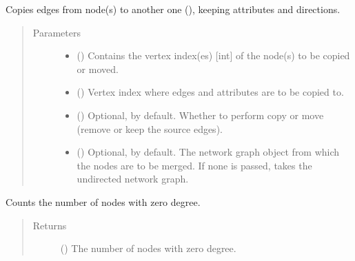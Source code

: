 \documentclass[letterpaper,10pt,english]{sphinxmanual}
\begin{document}
\begin{fulllineitems}
\begin{fulllineitems}
\label{\detokenize{reference:pypath.main.PyPath.copy_edges}}
Copies edges from  node(s) to another one (),
keeping attributes and directions.
\begin{quote}\begin{description}
\item[{Parameters}] \leavevmode\begin{itemize}
\item {} 
 () \textendash{} Contains the vertex index(es) {[}int{]} of the node(s) to be
copied or moved.

\item {} 
 () \textendash{} Vertex index where edges and attributes are to be copied to.

\item {} 
 () \textendash{} Optional,  by default. Whether to perform copy or
move (remove or keep the source edges).

\item {} 
 () \textendash{} Optional,  by default. The network graph object from
which the nodes are to be merged. If none is passed, takes
the undirected network graph.

\end{itemize}

\end{description}\end{quote}

\end{fulllineitems}


\begin{fulllineitems}
\label{\detokenize{reference:pypath.main.PyPath.count_sol}}
Counts the number of nodes with zero degree.
\begin{quote}\begin{description}
\item[{Returns}] \leavevmode
() \textendash{} The number of nodes with zero degree.


\end{description}
\end{quote}
\end{fulllineitems}
\end{fulllineitems}
\end{document}
